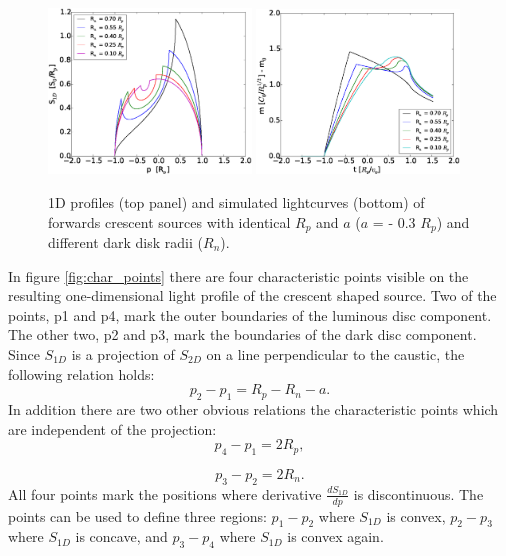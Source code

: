 \documentclass[usenatbib]{mn2e}
\begin{document}
\begin{figure}
\centering
    \includegraphics[width = 0.48\textwidth]{figures/S1D_var_rn_a_neg.eps}
    \includegraphics[width = 0.48\textwidth]{figures/5Rn_forw_var_magnification.eps}
\caption{\label{fig:lightcurve_crescent} 1D profiles (top panel) and simulated lightcurves (bottom) 
of forwards crescent sources with identical $R_p$ and $a$ ($a$ = - 0.3 $R_p$) and different dark disk radii ($R_n$). }
\end{figure}

In figure \ref{fig:char_points} there are four characteristic points visible on the resulting one-dimensional 
light profile of the crescent shaped source. Two of the points, p1 and p4, mark the outer boundaries of the
 luminous disc component. The other two, p2 and p3, mark the boundaries of the dark disc component. 
Since $S_{1D}$ is a projection of $S_{2D}$ on a line perpendicular to the caustic, the following relation holds:
\begin{equation}
    p_2-p_1 = R_p -R_n - a.
\end{equation}
In addition there are two other obvious relations the characteristic points which are independent of the projection:
\begin{equation}
    p_4 -p_1 = 2 R_p,
\end{equation}

\begin{equation}
        p_3 -p_2 = 2 R_n.
\end{equation}
All four points mark the positions where derivative $\frac{dS_{1D}}{dp}$ is discontinuous. The points can be used 
to define three regions: $p_1 - p_2$ where $S_{1D}$ is convex, $p_2 - p_3$ where $S_{1D}$ is concave, 
and $p_3 - p_4$ where $S_{1D}$ is convex again. \\
\end{document}
